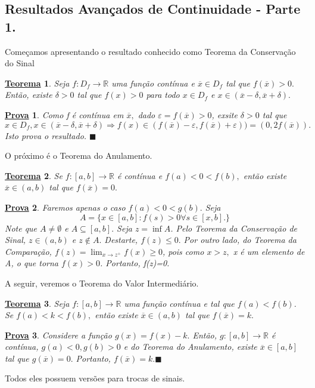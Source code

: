 \documentclass{article}
\newtheorem*{theorem*}{\underline{Teorema}}
\newtheorem*{proof*}{\underline{Prova}}
\renewcommand\qedsymbol{$\blacksquare$}
\begin{document}
\subsection{Resultados Avan\c cados de Continuidade - Parte 1.}
Come\c camos apresentando o resultado conhecido como Teorema da Conserva\c c\~ao do Sinal
 \begin{theorem*}
   Seja $f:D_{f}\rightarrow \mathbb{R}$ uma fun\c c\~ao cont\'inua e $\overline{x}\in D_{f}$ tal que $f(\overline{x})>0.$ 
   Ent\~ao, existe $\delta>0$ tal que $f(x)>0$ para todo $x\in D_{f}$ e $x\in(\overline{x}-\delta, \overline{x}+\delta).$
 \end{theorem*}
 \begin{proof*}
   Como f \'e cont\'inua em $\overline{x},$ dado $\varepsilon = f(\overline{x}) >0$, exsite $\delta > 0$ tal que 
     $$
       x\in D_{f}, x\in(\overline{x}-\delta, \overline{x}+\delta) \Rightarrow f(x)\in (f(\overline{x})-\varepsilon, f(\overline{x})+\varepsilon)) =
  (0, 2f(\overline{x})).
     $$
     Isto prova o resultado. \qedsymbol
 \end{proof*}
 O pr\'oximo \'e o Teorema do Anulamento.
 \begin{theorem*}
   Se $f:[a,b]\rightarrow \mathbb{R}$ \'e cont\'inua e $f(a)<0<f(b),$ ent\~ao existe $\overline{x}\in(a, b)$ tal que $f(\overline{x}) =0.$
 \end{theorem*}
\begin{proof*}
  Faremos apenas o caso $f(a)<0<g(b).$ Seja 
    $$
    A = \{x\in[a,b]:f(s)>0 \forall s\in[x, b].\}
    $$
    Note que $A\neq\emptyset$ e $A\subseteq{[a, b]}.$ Seja $z =\inf{A}$. Pelo Teorema da Conserva\c c\~ao de Sinal,
    $z\in(a, b)$ e $z\not\in A.$ Destarte, $f(z)\leq{0}.$ Por outro lado, do Teorema da Compara\c c\~ao, $f(z)=
    \lim_{x\to z^{+}}f(x)\geq{0}$, pois como $x > z,$ x \'e um elemento de A, o que torna $f(x)>0$. Portanto, f(z)=0.
\end{proof*}
 A seguir, veremos o Teorema do Valor Intermedi\'ario.
\begin{theorem*}
  Seja $f:[a, b]\rightarrow \mathbb{R}$ uma fun\c c\~ao cont\'inua e tal que  $f(a)<f(b)$. Se $f(a)<k<f(b),$
  ent\~ao existe $\overline{x}\in(a, b)$ tal que $f(\overline{x})=k.$
\end{theorem*}
\begin{proof*}
  Considere a fun\c c\~ao $g(x)=f(x)-k.$ Ent\~ao, $g:[a, b]\rightarrow \mathbb{R}$ \'e cont\'inua, $g(a)<0, g(b)>0$
  e do Teorema do Anulamento, existe $\overline{x}\in[a, b]$ tal que $g(\overline{x})=0.$ Portanto, $f(\overline{x})=k.$\qedsymbol
\end{proof*}
Todos eles possuem vers\~oes para trocas de sinais.
\end{document}
